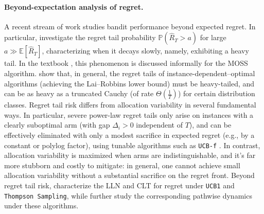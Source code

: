 \documentclass[nonblindrev]{informs3_noinforms}
\begin{document}
\paragraph{Beyond-expectation analysis of regret.}  A recent stream of work studies bandit performance beyond expected regret. In particular, \cite{fan2021fragility,simchi2022simple,simchi2023multi} investigate the regret tail probability $\mathbb{P}(\hat{R}_T > a )$ for large $a \gg \mathbb{E}[\hat{R}_T]$, characterizing when it decays slowly, namely, exhibiting a heavy tail. In the textbook \cite{lattimore2020bandit}, this phenomenon is discussed informally for the MOSS algorithm. \cite{fan2021fragility} show that, in general, the regret tails of instance-dependent–optimal algorithms (achieving the Lai–Robbins lower bound) must be heavy-tailed, and can be as heavy as a truncated Cauchy (of rate $\Theta(\frac{1}{T})$) for certain distribution classes. Regret tail risk differs from allocation variability in several fundamental ways.  In particular, severe power-law regret tails only arise on instances with a clearly suboptimal arm (with gap $\Delta_i > 0$ independent of $T$), and can be effectively eliminated with only a modest sacrifice in expected regret (e.g., by a constant or polylog factor), using tunable algorithms such as \texttt{UCB-f} \cite{fan2021fragility, simchi2023regret}. In contrast, allocation variability is maximized when arms are indistinguishable, and it's far more stubborn and costly to mitigate: in general, one cannot achieve small allocation variability without a substantial sacrifice on the regret front. Beyond regret tail risk, \cite{fan2022typical} characterize the LLN and CLT for regret under \texttt{UCB1} and \texttt{Thompson Sampling}, while \cite{kalvit2021closer,kuang2024weak} further study the corresponding pathwise dynamics under these algorithms.
\end{document}
